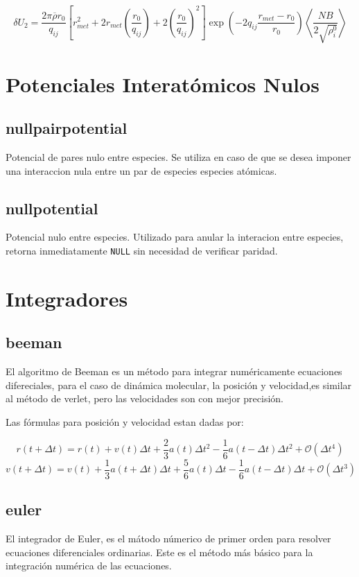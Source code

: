 $$\delta U_2 = \frac{2\pi\overline{\rho} r_0}{q_{ij}}\left[r^2_{met}+2r_{met}\left(\frac{r_0}{q_{ij}}\right)+2\left(\frac{r_0}{q_{ij}}\right)^2\right]\exp{\left(-2q_{ij}\frac{r_{met}-r_0}{r_0}\right)}\left<\frac{NB}{2\sqrt{\rho_i^0}}\right>$$


\section{Potenciales Interat\'omicos Nulos}
\subsection{nullpairpotential}
Potencial de pares nulo entre especies. Se utiliza en caso de que se desea imponer una interaccion nula entre un par de especies especies at\'omicas. 
\subsection{nullpotential}
Potencial nulo entre especies. Utilizado para anular la interacion entre especies, retorna inmediatamente \verb|NULL| sin necesidad de verificar paridad.

\section{Integradores}
\subsection{beeman}
El algoritmo de Beeman es un m\'etodo para integrar num\'ericamente ecuaciones difereciales, para el caso de din\'amica molecular, la posici\'on y velocidad,es similar al m\'etodo de verlet, pero las velocidades son con mejor precisi\'on.

Las f\'ormulas para posici\'on y velocidad estan dadas por:

$$r(t+\Delta t) = r(t) + v(t)\Delta t + \frac{2}{3}a(t)\Delta t^2 - \frac{1}{6}a(t-\Delta t)\Delta t^2 +\mathcal{O}(\Delta t^4)$$
$$v(t+\Delta t) = v(t) + \frac{1}{3}a(t+\Delta t)\Delta t+\frac{5}{6}a(t)\Delta t-\frac{1}{6}a(t-\Delta t)\Delta t+\mathcal{O}(\Delta t^3)$$

\subsection{euler}
El integrador de Euler, es el m\'atodo n\'umerico de primer orden para resolver ecuaciones diferenciales ordinarias. Este es el m\'etodo m\'as b\'asico para la integraci\'on num\'erica de las ecuaciones.

